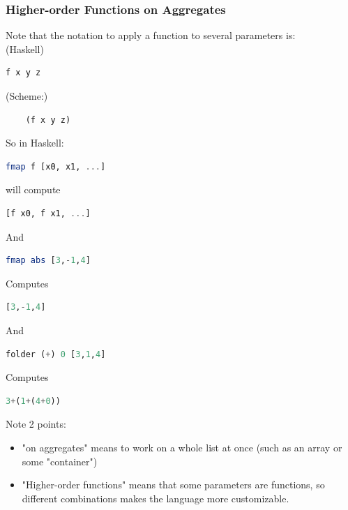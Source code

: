 \documentclass[12pt]{article}
\begin{document}
\subsubsection{Higher-order Functions on Aggregates}

Note that the notation to apply a function to several parameters is:
\\(Haskell)
\begin{lstlisting}[language=Haskell]
    f x y z
\end{lstlisting}
(Scheme:)
\begin{lstlisting}
    (f x y z)
\end{lstlisting}

So in Haskell:
\begin{lstlisting}[language=Haskell]
    fmap f [x0, x1, ...]
\end{lstlisting}

will compute

\begin{lstlisting}[language=Haskell]
    [f x0, f x1, ...]
\end{lstlisting}

And

\begin{lstlisting}[language=Haskell]
    fmap abs [3,-1,4]
\end{lstlisting}

Computes

\begin{lstlisting}[language=Haskell]
    [3,-1,4]
\end{lstlisting}

And

\begin{lstlisting}[language=Haskell]
    folder (+) 0 [3,1,4]
\end{lstlisting}

Computes

\begin{lstlisting}[language=Haskell]
    3+(1+(4+0))
\end{lstlisting}

Note 2 points:
\begin{itemize}
    \item "on aggregates" means to work on a whole list at once (such as an array or some "container")
    \item "Higher-order functions" means that some parameters are functions, so different combinations makes the language more customizable.
\end{itemize}
\end{document}

